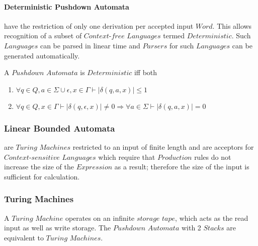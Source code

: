 \documentclass{article}
\begin{document}
\paragraph{Deterministic Pushdown Automata} have the
restriction of only one derivation per accepted input $Word$. This
allows recognition of a subset of $Context$-$free$ $Languages$ termed
$Deterministic$. Such $Languages$ can be parsed in linear time and
$Parsers$ for such $Languages$ can be generated automatically.

A $Pushdown$ $Automata$ is $Deterministic$ iff both
\begin{enumerate}
\item $\forall q \in Q, a \in \Sigma \cup {\epsilon}, x \in
  \Gamma \vdash |\delta(q,a,x)| \leq 1$
\item $\forall q \in Q, x \in \Gamma \vdash |\delta(q,\epsilon,x)|
  \neq 0 \Rightarrow \forall a \in \Sigma \vdash |\delta(q,a,x)|=0$
\end{enumerate}

\subsubsection{Linear Bounded Automata} are $Turing$ $Machines$
restricted to an input of finite length and are acceptors for
$Context$-$sensitive$ $Languages$ which require that $Production$
rules do not increase the size of the $Expression$ as a result;
therefore the size of the input is sufficient for calculation.

\subsubsection{Turing Machines}
A $Turing$ $Machine$ operates on an infinite $storage$ $tape$, which
acts as the read input as well as write storage. The $Pushdown$
$Automata$ with 2 $Stacks$ are equivalent to $Turing$ $Machines$.
\end{document}
